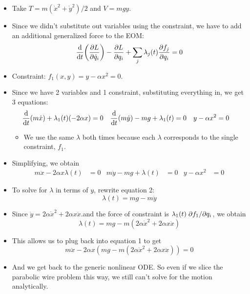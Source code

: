 \documentclass[../notes.tex]{subfiles}
\begin{document}
\begin{itemize}
\begin{itemize}
        \item Take $T=m(\dot{x}^2+\dot{y}^2)/2$ and $V=mgy$.
        \item Since we didn't substitute out variables using the constraint, we have to add an additional generalized force to the EOM:
        \begin{equation*}
            \dv{t}(\pdv{L}{\dot{q}_i})-\pdv{L}{q_i}+\sum_j\lambda_j(t)\pdv{f_j}{q_i} = 0
        \end{equation*}
        \item Constraint: $f_1(x,y)=y-\alpha x^2=0$.
        \item Since we have 2 variables and 1 constraint, substituting everything in, we get 3 equations:
        \begin{align*}
            \dv{t}(m\dot{x})+\lambda_1(t)(-2\alpha x) &= 0&
            \dv{t}(m\dot{y})-mg+\lambda_1(t) &= 0&
            y-\alpha x^2 &= 0
        \end{align*}
        \begin{itemize}
            \item We use the same $\lambda$ both times because each $\lambda$ corresponds to the single constraint, $f_1$.
        \end{itemize}
        \item Simplifying, we obtain
        \begin{align*}
            m\ddot{x}-2\alpha x\lambda(t) &= 0&
            m\ddot{y}-mg+\lambda(t) &= 0&
            y-\alpha x^2 &= 0
        \end{align*}
        \item To solve for $\lambda$ in terms of $y$, rewrite equation 2:
        \begin{equation*}
            \lambda(t) = mg-m\ddot{y}
        \end{equation*}
        \item Since $\ddot{y}=2\alpha\dot{x}^2+2\alpha x\ddot{x}$.and the force of constraint is $\lambda_1(t)\pdv*{f_1}{q_i}$, we obtain
        \begin{equation*}
            \lambda(t) = mg-m(2\alpha\dot{x}^2+2\alpha x\ddot{x})
        \end{equation*}
        \item This allows us to plug back into equation 1 to get
        \begin{equation*}
            m\ddot{x}-2\alpha x(mg-m(2\alpha\dot{x}^2+2\alpha x\ddot{x})) = 0
        \end{equation*}
        \item And we get back to the generic nonlinear ODE. So even if we slice the parabolic wire problem this way, we still can't solve for the motion analytically.

\end{itemize}
\end{itemize}
\end{document}
